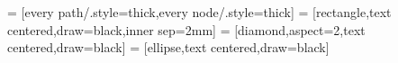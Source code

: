 


\usetikzlibrary{er}



 = [every path/.style={thick},every node/.style={thick}]
 = [rectangle,text centered,draw=black,inner sep=2mm]
 = [diamond,aspect=2,text centered,draw=black]
 = [ellipse,text centered,draw=black]
\newcommand{\primarykey}[1]{\underline{#1}}
\newcommand{\foreignkey}[1]{\ifmodulgeladen{icons}{\faLongArrowAltUp}{\uparrow}\,#1}
\newcommand{\fpkey}[1]{\foreignkey{\primarykey{#1}}}
